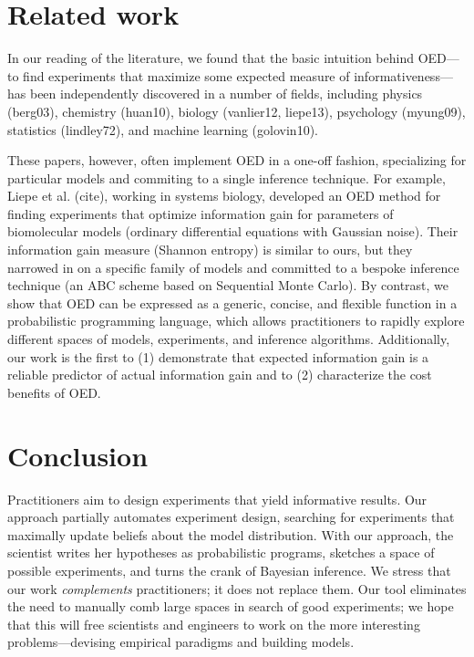 \documentclass{article}
\begin{document}
\section{Related work}

In our reading of the literature, we found that the basic intuition behind OED---to find experiments that maximize some expected measure of informativeness---has been independently discovered in a number of fields, including physics (berg03), chemistry (huan10), biology (vanlier12, liepe13), psychology (myung09), statistics (lindley72), and machine learning (golovin10).

These papers, however, often implement OED in a one-off fashion, specializing for  particular models and commiting to a single inference technique.
For example, Liepe et al. (cite), working in systems biology, developed an OED method for finding experiments that optimize information gain for parameters of biomolecular models (ordinary differential equations with Gaussian noise).
Their information gain measure (Shannon entropy) is similar to ours, but they narrowed in on a specific family of models and committed to a bespoke inference technique (an ABC scheme based on Sequential Monte Carlo).
By contrast, we show that OED can be expressed as a generic, concise, and flexible function in a probabilistic programming language, which allows practitioners to rapidly explore different spaces of models, experiments, and inference algorithms.
Additionally, our work is the first to (1) demonstrate that expected information gain is a reliable predictor of actual information gain and to (2) characterize the cost benefits of OED.

\section{Conclusion}

Practitioners aim to design experiments that yield informative results.
Our approach partially automates experiment design, searching for experiments that maximally update beliefs about the model distribution.
With our approach, the scientist writes her hypotheses as probabilistic programs, sketches a space of possible experiments, and turns the crank of Bayesian inference.
We stress that our work \emph{complements} practitioners; it does not replace them.
Our tool eliminates the need to manually comb large spaces in search of good experiments; we hope that this will free scientists and engineers to work on the more interesting problems---devising empirical paradigms and building models.
\end{document}
